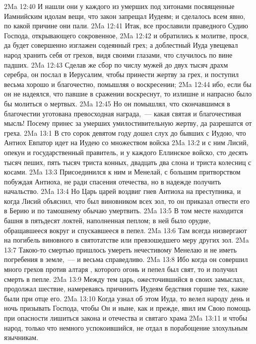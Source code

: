 \vs 2Ma 12:40 И нашли они у каждого из умерших под хитонами посвященные Иамнийским идолам вещи, что закон запрещал Иудеям; и сделалось всем явно, по какой причине они пали.
\vs 2Ma 12:41 Итак, все прославили праведного Судию Господа, открывающего сокровенное,
\vs 2Ma 12:42 и обратились к молитве, прося, да будет совершенно изглажен содеянный грех; а доблестный Иуда увещевал народ хранить себя от грехов, видя своими глазами, что случилось по вине падших.
\vs 2Ma 12:43 Сделав же сбор по числу мужей до двух тысяч драхм серебра, он послал в Иерусалим, чтобы принести жертву за грех, и поступил весьма хорошо и благочестно, помышляя о воскресении;
\vs 2Ma 12:44 ибо, если бы он не надеялся, что павшие в сражении воскреснут, то излишне и напрасно было бы молиться о мертвых.
\vs 2Ma 12:45 Но он помышлял, что скончавшимся в благочестии уготована превосходная награда,~--- какая святая и благочестивая мысль! Посему принес за умерших умилостивительную жертву, да разрешатся от греха.
\vs 2Ma 13:1 В сто сорок девятом году дошел слух до бывших с Иудою, что Антиох Евпатор идет на Иудею со множеством войска
\vs 2Ma 13:2 и с ним Лисий, опекун и государственный правитель, и у каждого Еллинское войско, сто десять тысяч пеших, пять тысяч триста конных, двадцать два слона и триста колесниц с косами.
\vs 2Ma 13:3 Присоединился к ним и Менелай, с большим притворством побуждая Антиоха, не ради спасения отечества, но в надежде получить начальство.
\vs 2Ma 13:4 Но Царь царей воздвиг гнев Антиоха на преступника, и когда Лисий объяснил, что  был виновником всех зол, то он приказал отвести его в Берию и по тамошнему обычаю умертвить.
\vs 2Ma 13:5 В том месте находится башня в пятьдесят локтей, наполненная пеплом; в ней было орудие, обращавшееся вокруг и спускавшееся в пепел.
\vs 2Ma 13:6 Там всегда низвергают на погибель виновного в святотатстве или превзошедшего меру других зол.
\vs 2Ma 13:7 Такою-то смертью пришлось умереть нечестивому Менелаю и не иметь погребения в земле,~--- и весьма справедливо.
\vs 2Ma 13:8 Ибо когда он совершил много грехов против алтаря , которого огонь и пепел был свят, то и получил смерть в пепле.
\rsbpar\vs 2Ma 13:9 Между тем царь, ожесточившийся в своих замыслах, продолжал шествие, намереваясь причинить Иудеям бедствия горшие тех, какие были при отце его.
\vs 2Ma 13:10 Когда узнал об этом Иуда, то велел народу день и ночь призывать Господа, чтобы Он и ныне, как и прежде, явил им Свою помощь при опасности лишиться закона и отечества и святаго храма
\vs 2Ma 13:11 и чтобы народ, только что немного успокоившийся, не отдал в порабощение злохульным язычникам.
